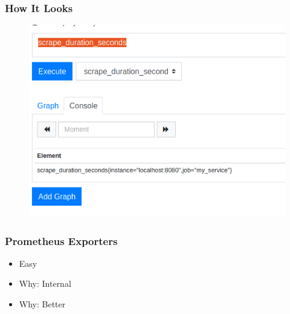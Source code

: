 \begin{frame}[fragile]
\frametitle{How It Looks}

\begin{figure}
\includegraphics[scale=0.25]{prometheus}
\end{figure}

\end{frame}

\begin{frame}
\frametitle{Prometheus Exporters}

\begin{itemize}
\item Easy\pause
\item Why: Internal\pause
\item Why: Better
\end{itemize}

\end{frame}


